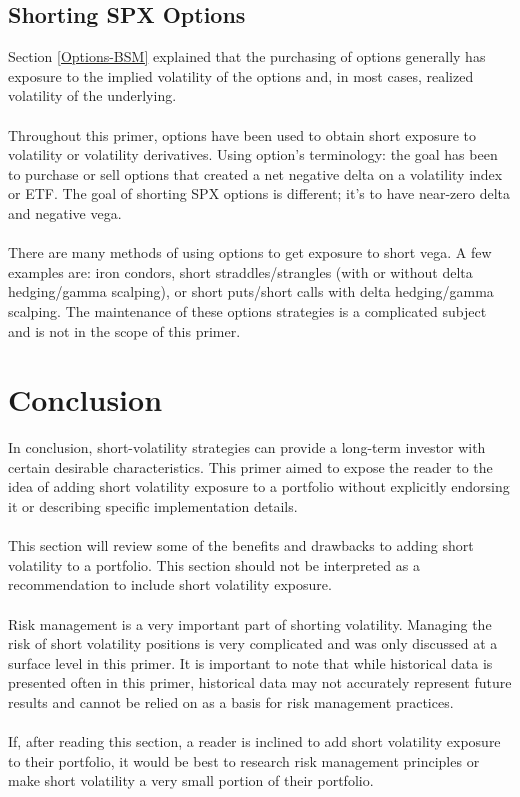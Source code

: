 \documentclass[11pt, oneside]{book}
\begin{document}
\section{Shorting SPX Options} \label{Investing-ShortSPXOpts}
Section \ref{Options-BSM} explained that the purchasing of options generally has exposure to the implied volatility of the options and, in most cases, realized volatility of the underlying.\\
\\
Throughout this primer, options have been used to obtain short exposure to volatility or volatility derivatives. Using option's terminology: the goal has been to purchase or sell options that created a net negative delta on a volatility index or ETF. The goal of shorting SPX options is different; it's to have near-zero delta and negative vega.\\
\\
There are many methods of using options to get exposure to short vega. A few examples are: iron condors, short straddles/strangles (with or without delta hedging/gamma scalping), or short puts/short calls with delta hedging/gamma scalping. The maintenance of these options strategies is a complicated subject and is not in the scope of this primer.

\chapter{Conclusion} \label{Conclusion}
In conclusion, short-volatility strategies can provide a long-term investor with certain desirable characteristics. This primer aimed to expose the reader to the idea of adding short volatility exposure to a portfolio without explicitly endorsing it or describing specific implementation details. \\
\\
This section will review some of the benefits and drawbacks to adding short volatility to a portfolio. This section should not be interpreted as a recommendation to include short volatility exposure. \\
\\
Risk management is a very important part of shorting volatility. Managing the risk of short volatility positions is very complicated and was only discussed at a surface level in this primer. It is important to note that while historical data is presented often in this primer, historical data may not accurately represent future results and cannot be relied on as a basis for risk management practices. \\
\\
If, after reading this section, a reader is inclined to add short volatility exposure to their portfolio, it would be best to research risk management principles or make short volatility a very small portion of their portfolio.
\end{document}
